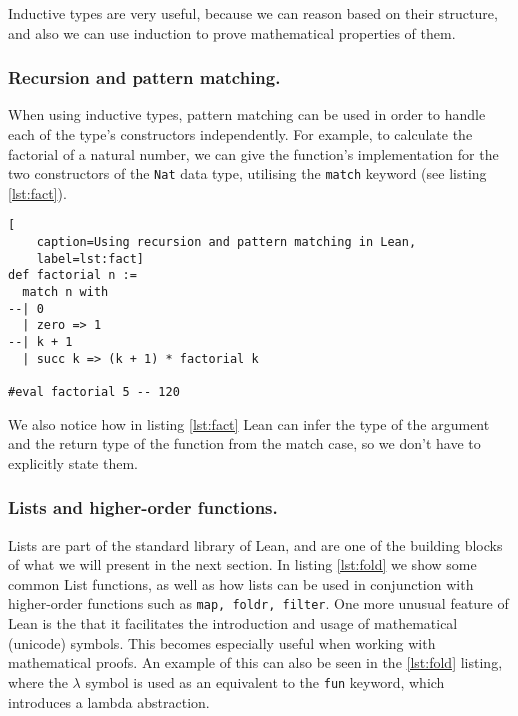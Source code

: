 \documentclass[runningheads]{llncs}
\begin{document}
Inductive types are very useful, because we can reason based on their
structure, and also we can use induction to prove mathematical properties
of them.

\subsubsection{Recursion and pattern matching.}

When using inductive types, pattern matching can be used in order to handle
each of the type's constructors independently. For example, to calculate the
factorial of a natural number, we can give the function's implementation for
the two constructors of the \lstinline{Nat} data type, utilising the
\lstinline{match} keyword (see listing \ref{lst:fact}).

\vspace{0.2cm}

\begin{lstlisting}[
    caption=Using recursion and pattern matching in Lean, 
    label=lst:fact]
def factorial n :=
  match n with
--| 0
  | zero => 1
--| k + 1
  | succ k => (k + 1) * factorial k

#eval factorial 5 -- 120
\end{lstlisting}

We also notice how in listing \ref{lst:fact} Lean can infer the type of the
argument and the return type of the function from the match case, so we don't
have to explicitly state them.

\subsubsection{Lists and higher-order functions.}

Lists are part of the standard library of Lean, and are one of the building
blocks of what we will present in the next section. In listing \ref{lst:fold}
we show some common List functions, as well as how lists can be used in
conjunction with higher-order functions such as \lstinline{map, foldr, filter}.
One more unusual feature of Lean is the that it facilitates the introduction
and usage of mathematical (unicode) symbols. This becomes especially useful
when working with mathematical proofs. An example of this can also be seen in
the \ref{lst:fold} listing, where the $\lambda$ symbol is used as an equivalent
to the \lstinline{fun} keyword, which introduces a lambda abstraction. 
\end{document}
